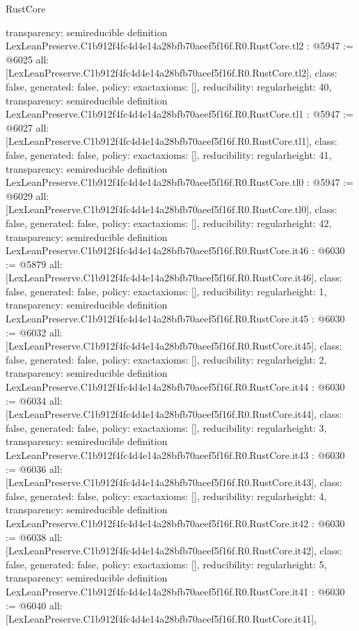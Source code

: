 \begin{lexlean}{RustCore}
\begin{coremodule}
{  transparency: semireducible
}
definition LexLeanPreserve.C1b912f4fc4d4e14a28bfb70aeef5f16f.R0.RustCore.tl2 : @5947 := @6025 {
  all: [LexLeanPreserve.C1b912f4fc4d4e14a28bfb70aeef5f16f.R0.RustCore.tl2],
  class: false,
  generated: false,
  policy: exact{axioms: []},
  reducibility: regular{height: 40},
  transparency: semireducible
}
definition LexLeanPreserve.C1b912f4fc4d4e14a28bfb70aeef5f16f.R0.RustCore.tl1 : @5947 := @6027 {
  all: [LexLeanPreserve.C1b912f4fc4d4e14a28bfb70aeef5f16f.R0.RustCore.tl1],
  class: false,
  generated: false,
  policy: exact{axioms: []},
  reducibility: regular{height: 41},
  transparency: semireducible
}
definition LexLeanPreserve.C1b912f4fc4d4e14a28bfb70aeef5f16f.R0.RustCore.tl0 : @5947 := @6029 {
  all: [LexLeanPreserve.C1b912f4fc4d4e14a28bfb70aeef5f16f.R0.RustCore.tl0],
  class: false,
  generated: false,
  policy: exact{axioms: []},
  reducibility: regular{height: 42},
  transparency: semireducible
}
definition LexLeanPreserve.C1b912f4fc4d4e14a28bfb70aeef5f16f.R0.RustCore.it46 : @6030 := @5879 {
  all: [LexLeanPreserve.C1b912f4fc4d4e14a28bfb70aeef5f16f.R0.RustCore.it46],
  class: false,
  generated: false,
  policy: exact{axioms: []},
  reducibility: regular{height: 1},
  transparency: semireducible
}
definition LexLeanPreserve.C1b912f4fc4d4e14a28bfb70aeef5f16f.R0.RustCore.it45 : @6030 := @6032 {
  all: [LexLeanPreserve.C1b912f4fc4d4e14a28bfb70aeef5f16f.R0.RustCore.it45],
  class: false,
  generated: false,
  policy: exact{axioms: []},
  reducibility: regular{height: 2},
  transparency: semireducible
}
definition LexLeanPreserve.C1b912f4fc4d4e14a28bfb70aeef5f16f.R0.RustCore.it44 : @6030 := @6034 {
  all: [LexLeanPreserve.C1b912f4fc4d4e14a28bfb70aeef5f16f.R0.RustCore.it44],
  class: false,
  generated: false,
  policy: exact{axioms: []},
  reducibility: regular{height: 3},
  transparency: semireducible
}
definition LexLeanPreserve.C1b912f4fc4d4e14a28bfb70aeef5f16f.R0.RustCore.it43 : @6030 := @6036 {
  all: [LexLeanPreserve.C1b912f4fc4d4e14a28bfb70aeef5f16f.R0.RustCore.it43],
  class: false,
  generated: false,
  policy: exact{axioms: []},
  reducibility: regular{height: 4},
  transparency: semireducible
}
definition LexLeanPreserve.C1b912f4fc4d4e14a28bfb70aeef5f16f.R0.RustCore.it42 : @6030 := @6038 {
  all: [LexLeanPreserve.C1b912f4fc4d4e14a28bfb70aeef5f16f.R0.RustCore.it42],
  class: false,
  generated: false,
  policy: exact{axioms: []},
  reducibility: regular{height: 5},
  transparency: semireducible
}
definition LexLeanPreserve.C1b912f4fc4d4e14a28bfb70aeef5f16f.R0.RustCore.it41 : @6030 := @6040 {
  all: [LexLeanPreserve.C1b912f4fc4d4e14a28bfb70aeef5f16f.R0.RustCore.it41],
}
\end{coremodule}
\end{lexlean}
